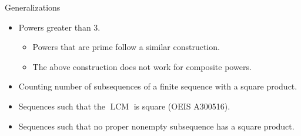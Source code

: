 \documentclass{beamer}
\begin{document}
\begin{frame}{Generalizations}
  \begin{itemize}
    \item Powers greater than 3.
      \begin{itemize}
        \item Powers that are prime follow a similar construction.
        \item The above construction does not work for composite powers.
      \end{itemize}
    \item Counting number of subsequences of a finite sequence with a square
      product.
    \item Sequences such that the $\operatorname{LCM}$ is square (OEIS A300516).
    \item Sequences such that no proper nonempty subsequence has a
      square product.
  \end{itemize}
\end{frame}
\end{document}
